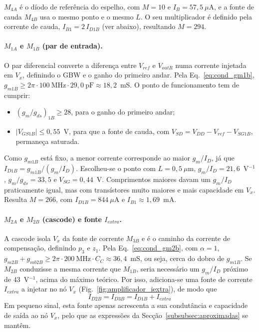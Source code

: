 $M_{4A}$ é o díodo de referência do espelho, com $M = 10$ e $I_B = 57{,}5~\mu$A, e a fonte de cauda
$M_{4B}$ usa o mesmo ponto e o mesmo $L$. O seu multiplicador é definido pela corrente de cauda,
$I_{B1} = 2\,I_{D1B}$ (ver abaixo), resultando $M = 294$.

\paragraph{$M_{1A}$ e $M_{1B}$ (par de entrada).}
O par diferencial converte a diferença entre $V_{ref}$ e $V_{outR}$ numa corrente injetada em $V_x$,
definindo o GBW e o ganho do primeiro andar. Pela Eq.~\eqref{eq:cond_gm1b}, $g_{m1B} \ge 2\pi
\cdot 100~\text{MHz} \cdot 29{,}0~\text{pF} \approx 18{,}2$~mS. O ponto de funcionamento tem de
cumprir:
\begin{itemize}
    \item $(g_m/g_{ds})_{1B} \ge 28$, para o ganho do primeiro andar;
    \item $|V_{GS1B}| \le 0{,}55$~V, para que a fonte de cauda, com $V_{SD} = V_{DD} - V_{ref} - V_{SG1B}$, permaneça saturada.
\end{itemize}

Como $g_{m1B}$ está fixo, a menor corrente corresponde ao maior $g_m/I_D$, já que $I_{D1B} =
g_{m1B}/(g_m/I_D)$. Escolheu-se o ponto com $L = 0{,}5~\mu$m, $g_m/I_D = 21{,}6$~V$^{-1}$,
$g_m/g_{ds} = 33{,}5$ e $V_{SG} = 0{,}44$~V. Comprimentos maiores davam um $g_m/I_D$ praticamente
igual, mas com transístores muito maiores e mais capacidade em $V_x$. Resulta $M = 266$, com
$I_{D1B} = 844~\mu$A e $I_{B1} \approx 1{,}69$~mA.

\paragraph{$M_{2A}$ e $M_{2B}$ (cascode) e fonte $I_{extra}$.}
A cascode isola $V_x$ da fonte de corrente $M_{3B}$ e é o caminho da corrente de compensação,
definindo $p_3$ e $z_1$. Pela Eq.~\eqref{eq:cond_gm2b}, com $\alpha = 1$, $g_{m2B} + g_{mb2B}
\ge 2\pi \cdot 200~\text{MHz} \cdot C_C \approx 36{,}4$~mS, ou seja, cerca do dobro de $g_{m1B}$.
Se $M_{2B}$ conduzisse a mesma corrente que $M_{1B}$, seria necessário um $g_m/I_D$ próximo de
43~V$^{-1}$, acima do máximo teórico. Por isso, adiciona-se uma fonte de corrente $I_{extra}$ a
injetar no nó $V_x$ (Fig.~\ref{fig:amplificador_iextra}), de modo que
\begin{equation}
    I_{D2B} = I_{D3B} = I_{D1B} + I_{extra}
\end{equation}
Em pequeno sinal, esta fonte apenas acrescenta a sua condutância e capacidade de saída ao nó $V_x$,
pelo que as expressões da Secção~\ref{subsubsec:aproximadas} se mantêm.

